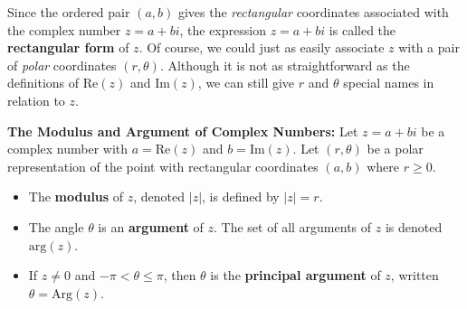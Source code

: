 Since the ordered pair $(a,b)$ gives the \textit{rectangular} coordinates associated with the complex number $z = a+bi$, the expression $z=a+bi$ is called the \textbf{rectangular form} of $z$. Of course, we could just as easily associate $z$ with a pair of \textit{polar} coordinates $(r,\theta)$.  Although it is not as straightforward as the definitions of $\text{Re}(z)$ and $\text{Im}(z)$, we can still give $r$ and $\theta$ special names in relation to $z$.

\smallskip

\colorbox{ResultColor}{\bbm
\begin{defn} \label{modulusargumentdefn} \textbf{The Modulus and Argument of Complex Numbers:}  Let $z = a+bi$ be a complex number with $a = \text{Re}(z)$ and $b=\text{Im}(z)$.  Let $(r,\theta)$ be a polar representation of the point with rectangular coordinates $(a,b)$ where $r \geq 0$.

\begin{itemize}

\item  The \textbf{modulus} of $z$, denoted $|z|$, is defined by $|z| = r$.

\item  The angle $\theta$ is an \textbf{argument} of $z$. The set of all arguments of $z$ is denoted $\text{arg}(z)$.

\item  If $z \neq 0$ and $-\pi < \theta \leq \pi$, then $\theta$ is the \textbf{principal argument} of $z$, written $\theta = \text{Arg}(z)$. 

\end{itemize}

\end{defn}

\ebm}

\smallskip

